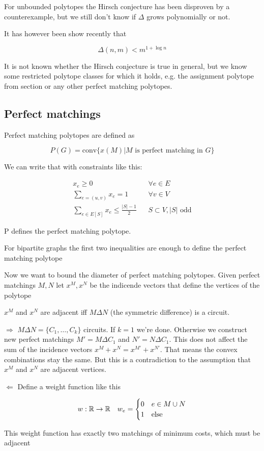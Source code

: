 For unbounded polytopes the Hirsch conjecture has been disproven by a counterexample, but we still don't know if $\Delta$ grows polynomially or not.

It has however been show recently that 

\[\Delta(n,m)<m^{1+\log n}\]

It is not known whether the Hirsch conjecture is true in general, but we know some restricted polytope classes for which it holds, e.g. the assignment polytope from section \label{sec:maxAssignment} or any other perfect matching polytopes.

\subsection{Perfect matchings}

Perfect matching polytopes are defined as

\[P(G) = \text{conv} \{x(M) |M \text{ is perfect matching in }G\}\]

We can write that with constraints like this:

\begin{align*}
x_e \geq 0 &&\forall e\in E\\
\sum_{e=(u,v)} x_e = 1 &&\forall v\in V\\
\sum_{e\in E[S]} x_e \leq \frac{|S|-1}{2} &&S\subset V, |S| \text{ odd}
\end{align*}

\begin{thm} P defines the perfect matching polytope.\end{thm}
\begin{thm} For bipartite graphs the first two inequalities are enough to define the perfect matching polytope\end{thm}

Now we want to bound the diameter of perfect matching polytopes. Given perfect matchings $M,N$ let $x^M,x^N$ be the indicende vectors that define the vertices of the polytope

\begin{lem} $x^M$ and $x^N$ are adjacent iff $M\Delta N$ (the symmetric difference) is a circuit.\end{lem}

\begin{pr} $\Rightarrow$ $M\Delta N = \{C_1,\ldots, C_k\}$ circuits. If $k=1$ we're done. Otherwise we construct new perfect matchings $M'=M\Delta C_1$ and $N'=N\Delta C_1$. This does not affect the sum of the incidence vectors $x^M+x^N=x^{M'} +x^{N'}$. That means the convex combinations stay the same. But this is a contradiction to the assumption that $x^M$ and $x^N$ are adjacent vertices.

$\Leftarrow$ Define a weight function like this

\[w:\mathbb{R} \rightarrow \mathbb{R} \quad w_e=\begin{cases}0 & e\in M\cup N\\ 1 &\text{else}\end{cases}\]

This weight function has exactly two matchings of minimum costs, which must be adjacent
\end{pr}
